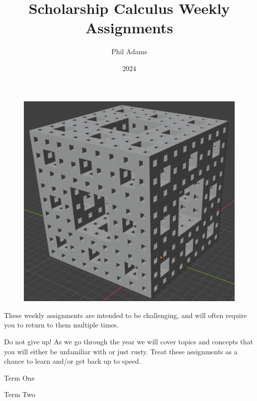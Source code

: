 \documentclass[12pt, letterpaper]{article}
\title{Scholarship Calculus Weekly Assignments}
\author{Phil Adams}
\date{2024}
\begin{document}
\maketitle

\begin{figure}[H]
    \centering
    \includegraphics[width=0.5\linewidth]{images/menger.png}
\end{figure}

\setlength{\parskip}{15pt}

These weekly assignments are intended to be challenging, and will often require you to return to them multiple times.

Do not give up! As we go through the year we will cover topics and concepts that you will either be unfamiliar with or just rusty. Treat these assignments as a chance to learn and/or get back up to speed.

\pagebreak
\begin{center}
    \huge
    Term One
    \normalsize
\end{center}
\restoregeometry

\pagebreak

\pagebreak

\pagebreak

\pagebreak

\pagebreak

\pagebreak

\pagebreak

\pagebreak

\pagebreak


\pagebreak
\begin{center}
    \huge
    Term Two
    \normalsize
\end{center}
\restoregeometry

\pagebreak

\pagebreak

\pagebreak

\pagebreak

\pagebreak

\pagebreak

\pagebreak

\pagebreak

\end{document}
